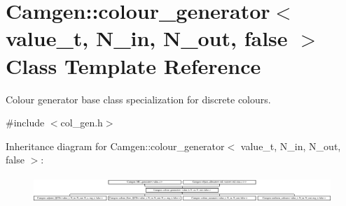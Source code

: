 \hypertarget{a00078}{}\section{Camgen\+:\+:colour\+\_\+generator$<$ value\+\_\+t, N\+\_\+in, N\+\_\+out, false $>$ Class Template Reference}
\label{a00078}


Colour generator base class specialization for discrete colours.  




{\ttfamily \#include $<$col\+\_\+gen.\+h$>$}

Inheritance diagram for Camgen\+:\+:colour\+\_\+generator$<$ value\+\_\+t, N\+\_\+in, N\+\_\+out, false $>$\+:\begin{figure}[H]
\begin{center}
\leavevmode
\includegraphics[height=0.997625cm]{a00078}
\end{center}
\end{figure}
